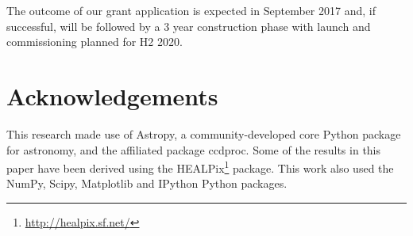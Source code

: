 \documentclass[]{iac}
\begin{document}
The outcome of our grant application is expected in September 2017 and, if successful, will be followed by a 3
year construction phase with launch and commissioning planned for H2 2020.

\section*{Acknowledgements}

This research made use of Astropy, a community-developed core Python package for astronomy\cite{Robitaille2013}, and the
affiliated package ccdproc\cite{Craig2015}. Some of the results in this paper have been derived using the
HEALPix\footnote{\url{http://healpix.sf.net/}}\cite{Gorski2004} package. This work also used the
NumPy\cite{VanderWalt2011}, Scipy\cite{Jones2001}, Matplotlib\cite{Hunter2007} and IPython\cite{Perez2007} Python
packages.


\end{document}
